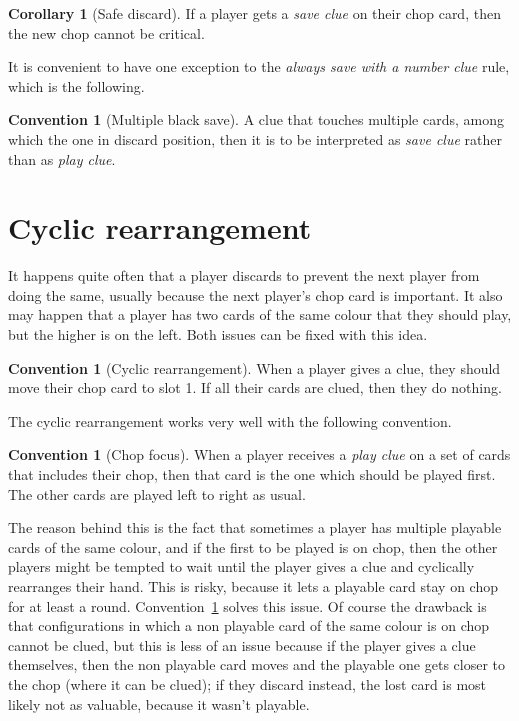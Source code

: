 \documentclass[a4paper]{article}
\theoremstyle{plain}
\theoremstyle{definition}
\newtheorem{corollary}[theorem]{Corollary}
\newtheorem{convention}[theorem]{Convention}
\begin{document}
\begin{corollary}[Safe discard]
	If a player gets a \emph{save clue} on their chop card, then the new chop cannot be critical.
\end{corollary}

It is convenient to have one exception to the \emph{always save with a number clue} rule, which is the following.

\begin{convention}[Multiple black save]
	A  clue that touches multiple cards, among which the one in discard position, then it is to be interpreted as \emph{save clue} rather than as \emph{play clue}.
\end{convention}

\section{Cyclic rearrangement}

It happens quite often that a player discards to prevent the next player from doing the same, usually because the next player's chop card is important. It also may happen that a player has two cards of the same colour that they should play, but the higher is on the left. Both issues can be fixed with this idea.

\begin{convention}[Cyclic rearrangement]
	\label{cyclic-rearrangement}
	When a player gives a clue, they should move their chop card to slot 1. If all their cards are clued, then they do nothing.
\end{convention}

The cyclic rearrangement works very well with the following convention.

\begin{convention}[Chop focus]
	\label{chop-focus}
	When a player receives a \emph{play clue} on a set of cards that includes their chop, then that card is the one which should be played first. The other cards are played left to right as usual.
\end{convention}

The reason behind this is the fact that sometimes a player has multiple playable cards of the same colour, and if the first to be played is on chop, then the other players might be tempted to wait until the player gives a clue and cyclically rearranges their hand. This is risky, because it lets a playable card stay on chop for at least a round. Convention~\ref{chop-focus} solves this issue. Of course the drawback is that configurations in which a non playable card of the same colour is on chop cannot be clued, but this is less of an issue because if the player gives a clue themselves, then the non playable card moves and the playable one gets closer to the chop (where it can be clued); if they discard instead, the lost card is most likely not as valuable, because it wasn't playable.
\end{document}
